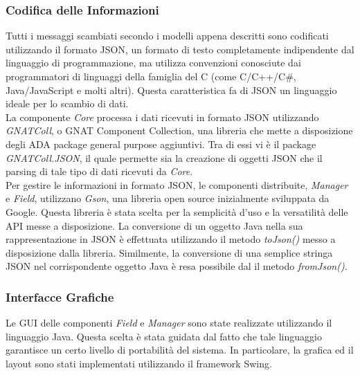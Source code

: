 \subsubsection{Codifica delle Informazioni}

Tutti i messaggi scambiati secondo i modelli appena descritti sono codificati utilizzando il formato JSON, un formato di testo completamente indipendente dal linguaggio di programmazione, ma utilizza convenzioni conosciute dai programmatori di linguaggi della famiglia del C (come C/C++/C\#, Java/JavaScript e molti altri). Questa caratteristica fa di JSON un linguaggio ideale per lo scambio di dati.\\

La componente \emph{Core} processa i dati ricevuti in formato JSON utilizzando \emph{GNATColl}, o GNAT Component Collection, una libreria che mette a disposizione degli ADA package general purpose aggiuntivi. Tra di essi vi è il package \emph{GNATColl.JSON}, il quale permette sia la creazione di oggetti JSON che il parsing di tale tipo di dati ricevuti da \emph{Core}.\\

Per gestire le informazioni in formato JSON, le componenti distribuite, \emph{Manager} e \emph{Field}, utilizzano \emph{Gson}, una libreria open source  inizialmente sviluppata da Google. Questa libreria è stata scelta per la semplicità d'uso e la versatilità delle API messe a disposizione. La conversione di un oggetto Java nella sua rappresentazione in JSON è effettuata utilizzando il metodo \emph{toJson()} messo a disposizione dalla libreria. Similmente, la conversione di una semplice stringa JSON nel corrispondente oggetto Java è resa possibile dal il metodo \emph{fromJson()}.

\subsubsection{Interfacce Grafiche}
Le GUI delle componenti \emph{Field} e \emph{Manager} sono state realizzate utilizzando il linguaggio Java. Questa scelta \`{e} stata guidata dal fatto che tale linguaggio garantisce un certo livello di portabilit\`{a} del sistema. In particolare, la grafica ed il layout sono stati implementati utilizzando il framework Swing.
